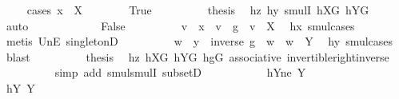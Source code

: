 \begin{isabellebody}
\ \ \ \ \isamarkupfalse%
{\isacharparenleft}{\kern0pt}cases\ {\isachardoublequoteopen}x\ {\isasymin}\ X{\isachardoublequoteclose}{\isacharparenright}{\kern0pt}\isanewline
\ \ \ \ \ \ \isamarkupfalse%
\ True\isanewline
\ \ \ \ \ \ \isamarkupfalse%
\ \isamarkupfalse%
\ {\isacharquery}{\kern0pt}thesis\ \isamarkupfalse%
\ hz\ hy\ smulI\ hXG\ hYG\ \isamarkupfalse%
\ auto\isanewline
\ \ \ \ \isamarkupfalse%
\isanewline
\ \ \ \ \ \ \isamarkupfalse%
\ False\isanewline
\ \ \ \ \ \ \isamarkupfalse%
\ \isamarkupfalse%
\ v\ \ {\isachardoublequoteopen}x\ {\isacharequal}{\kern0pt}\ v\ {\isasymcdot}\ g{\isachardoublequoteclose}\ \ {\isachardoublequoteopen}v\ {\isasymin}\ X{\isachardoublequoteclose}\ \isamarkupfalse%
\ hx\ smul{\isachardot}{\kern0pt}cases\ \isamarkupfalse%
\ {\isacharparenleft}{\kern0pt}metis\ UnE\ singletonD{\isacharparenright}{\kern0pt}\isanewline
\ \ \ \ \ \ \isamarkupfalse%
\ \isamarkupfalse%
\ w\ \ {\isachardoublequoteopen}y\ {\isacharequal}{\kern0pt}\ inverse\ g\ {\isasymcdot}\ w{\isachardoublequoteclose}\ \ {\isachardoublequoteopen}w\ {\isasymin}\ Y{\isachardoublequoteclose}\ \isamarkupfalse%
\ hy\ smul{\isachardot}{\kern0pt}cases\ \isamarkupfalse%
\ blast\isanewline
\ \ \ \ \ \ \isamarkupfalse%
\ \isamarkupfalse%
\ {\isacharquery}{\kern0pt}thesis\ \isamarkupfalse%
\ hz\ hXG\ hYG\ hgG\ associative\ invertible{\isacharunderscore}{\kern0pt}right{\isacharunderscore}{\kern0pt}inverse{}\isanewline
\ \ \ \ \ \ \ \ \isamarkupfalse%
\ {\isacharparenleft}{\kern0pt}simp\ add{\isacharcolon}{\kern0pt}\ smul{\isachardot}{\kern0pt}smulI\ subsetD{\isacharparenright}{\kern0pt}\isanewline
\ \ \ \ \isamarkupfalse%
\isanewline
\ \ \isamarkupfalse%
\isanewline
\ \ \isamarkupfalse%
\ hY{}ne{\isacharcolon}{\kern0pt}\ {\isachardoublequoteopen}{\isacharquery}{\kern0pt}Y{}\ {\isasymnoteq}\ {\isacharbraceleft}{\kern0pt}{\isacharbraceright}{\kern0pt}{\isachardoublequoteclose}\isanewline
\ \ \isamarkupfalse%
\isanewline
\ \ \ \ \isamarkupfalse%
\ hY{}{\isacharcolon}{\kern0pt}\ {\isachardoublequoteopen}{\isacharquery}{\kern0pt}Y{}\ {\isacharequal}{\kern0pt}\ {\isacharbraceleft}{\kern0pt}{\isacharbraceright}{\kern0pt}{\isachardoublequoteclose}\isanewline

\end{isabellebody}
